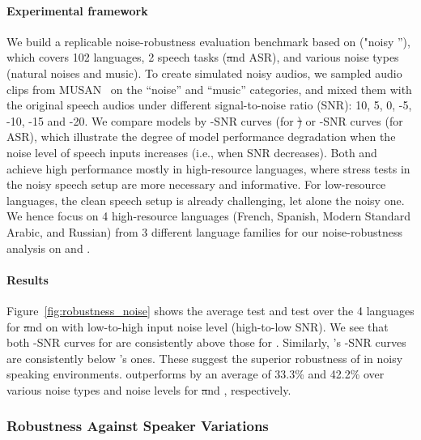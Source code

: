 \paragraph{Experimental framework} We build a replicable noise-robustness evaluation benchmark based on \fleurs ("noisy \fleurs''), which covers 102 languages, 2 speech tasks (\st and ASR), and various noise types (natural noises and music). To create simulated noisy audios, we sampled audio clips from MUSAN~\citep{snyder2015musan} on the ``noise'' and ``music'' categories, and mixed them with the original \fleurs speech audios under different signal-to-noise ratio (SNR): 10, 5, 0, -5, -10, -15 and -20. We compare models by \bleu-SNR curves (for \st) or \wer-SNR curves (for ASR), which illustrate the degree of model performance degradation when the noise level of speech inputs increases (i.e., when SNR decreases). Both \mfourtlg and \whisperlarge achieve high performance mostly in high-resource languages, where stress tests in the noisy speech setup are more necessary and informative. For low-resource languages, the clean speech setup is already challenging, let alone the noisy one. We hence focus on 4 high-resource languages (French, Spanish, Modern Standard Arabic, and Russian) from 3 different language families for our noise-robustness analysis on \mfourtlg and \whisperlarge.

\paragraph{Results} Figure~\ref{fig:robustness_noise} shows the average test \bleu and test \wer over the 4 languages for \xeng{} \st and \asr on \fleurs with low-to-high input noise level (high-to-low SNR). We see that both \bleu-SNR curves for \mfourtlg are consistently above those for \whisperlarge. Similarly, \mfourtlg's \wer-SNR curves are consistently below \whisperlarge's ones. These suggest the superior robustness of \mfourtlg in noisy speaking environments. \mfourtlg outperforms \whisperlarge by an average of 33.3\% and 42.2\% over various noise types and noise levels for \xeng{} \st and \asr, respectively.



\subsubsection{Robustness Against Speaker Variations}
\label{subsec:robustnessspeakervariation}

